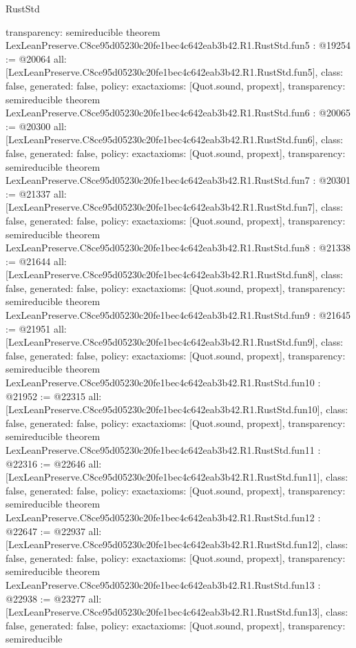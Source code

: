\begin{lexlean}{RustStd}
\begin{coremodule}
{  transparency: semireducible
}
theorem LexLeanPreserve.C8ce95d05230c20fe1bec4c642eab3b42.R1.RustStd.fun5 : @19254 := @20064 {
  all: [LexLeanPreserve.C8ce95d05230c20fe1bec4c642eab3b42.R1.RustStd.fun5],
  class: false,
  generated: false,
  policy: exact{axioms: [Quot.sound, propext]},
  transparency: semireducible
}
theorem LexLeanPreserve.C8ce95d05230c20fe1bec4c642eab3b42.R1.RustStd.fun6 : @20065 := @20300 {
  all: [LexLeanPreserve.C8ce95d05230c20fe1bec4c642eab3b42.R1.RustStd.fun6],
  class: false,
  generated: false,
  policy: exact{axioms: [Quot.sound, propext]},
  transparency: semireducible
}
theorem LexLeanPreserve.C8ce95d05230c20fe1bec4c642eab3b42.R1.RustStd.fun7 : @20301 := @21337 {
  all: [LexLeanPreserve.C8ce95d05230c20fe1bec4c642eab3b42.R1.RustStd.fun7],
  class: false,
  generated: false,
  policy: exact{axioms: [Quot.sound, propext]},
  transparency: semireducible
}
theorem LexLeanPreserve.C8ce95d05230c20fe1bec4c642eab3b42.R1.RustStd.fun8 : @21338 := @21644 {
  all: [LexLeanPreserve.C8ce95d05230c20fe1bec4c642eab3b42.R1.RustStd.fun8],
  class: false,
  generated: false,
  policy: exact{axioms: [Quot.sound, propext]},
  transparency: semireducible
}
theorem LexLeanPreserve.C8ce95d05230c20fe1bec4c642eab3b42.R1.RustStd.fun9 : @21645 := @21951 {
  all: [LexLeanPreserve.C8ce95d05230c20fe1bec4c642eab3b42.R1.RustStd.fun9],
  class: false,
  generated: false,
  policy: exact{axioms: [Quot.sound, propext]},
  transparency: semireducible
}
theorem LexLeanPreserve.C8ce95d05230c20fe1bec4c642eab3b42.R1.RustStd.fun10 : @21952 := @22315 {
  all: [LexLeanPreserve.C8ce95d05230c20fe1bec4c642eab3b42.R1.RustStd.fun10],
  class: false,
  generated: false,
  policy: exact{axioms: [Quot.sound, propext]},
  transparency: semireducible
}
theorem LexLeanPreserve.C8ce95d05230c20fe1bec4c642eab3b42.R1.RustStd.fun11 : @22316 := @22646 {
  all: [LexLeanPreserve.C8ce95d05230c20fe1bec4c642eab3b42.R1.RustStd.fun11],
  class: false,
  generated: false,
  policy: exact{axioms: [Quot.sound, propext]},
  transparency: semireducible
}
theorem LexLeanPreserve.C8ce95d05230c20fe1bec4c642eab3b42.R1.RustStd.fun12 : @22647 := @22937 {
  all: [LexLeanPreserve.C8ce95d05230c20fe1bec4c642eab3b42.R1.RustStd.fun12],
  class: false,
  generated: false,
  policy: exact{axioms: [Quot.sound, propext]},
  transparency: semireducible
}
theorem LexLeanPreserve.C8ce95d05230c20fe1bec4c642eab3b42.R1.RustStd.fun13 : @22938 := @23277 {
  all: [LexLeanPreserve.C8ce95d05230c20fe1bec4c642eab3b42.R1.RustStd.fun13],
  class: false,
  generated: false,
  policy: exact{axioms: [Quot.sound, propext]},
  transparency: semireducible
}
\end{coremodule}
\end{lexlean}
